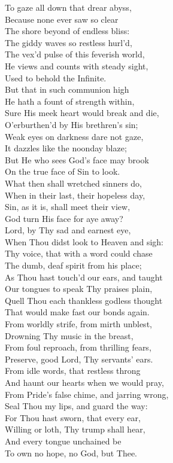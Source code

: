  To gaze all down that drear abyss, \\
 Because none ever saw so clear \\
 The shore beyond of endless bliss: \\
 The giddy waves so restless hurl’d, \\
 The vex’d pulse of this feverish world, \\
 He views and counts with steady sight, \\
 Used to behold the Infinite. \\
  But that in such communion high \\
 He hath a fount of strength within, \\
 Sure His meek heart would break and die, \\
 O’erburthen’d by His brethren’s sin; \\
 Weak eyes on darkness dare not gaze, \\
 It dazzles like the noonday blaze; \\
 But He who sees God’s face may brook \\
 On the true face of Sin to look. \\
  What then shall wretched sinners do, \\
 When in their last, their hopeless day, \\
 Sin, as it is, shall meet their view, \\
 God turn His face for aye away? \\
 Lord, by Thy sad and earnest eye, \\
 When Thou didst look to Heaven and sigh: \\
 Thy voice, that with a word could chase \\
 The dumb, deaf spirit from his place; \\
  As Thou hast touch’d our ears, and taught \\
 Our tongues to speak Thy praises plain, \\
 Quell Thou each thankless godless thought \\
 That would make fast our bonds again. \\
 From worldly strife, from mirth unblest, \\
 Drowning Thy music in the breast, \\
 From foul reproach, from thrilling fears, \\
 Preserve, good Lord, Thy servants’ ears. \\
  From idle words, that restless throng \\
 And haunt our hearts when we would pray, \\
 From Pride’s false chime, and jarring wrong, \\
 Seal Thou my lips, and guard the way: \\
 For Thou hast sworn, that every ear, \\
 Willing or loth, Thy trump shall hear, \\
 And every tongue unchained be \\
 To own no hope, no God, but Thee.\\

